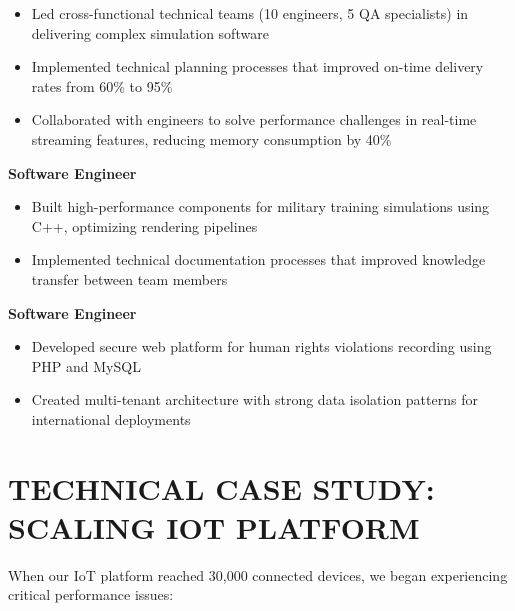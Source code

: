 \documentclass{fullstackdeveloper-ats}
\begin{document}
\begin{itemize}
    \item Led cross-functional technical teams (10 engineers, 5 QA specialists) in delivering complex simulation software
    \item Implemented technical planning processes that improved on-time delivery rates from 60\% to 95\%
    \item Collaborated with engineers to solve performance challenges in real-time streaming features, reducing memory consumption by 40\%
\end{itemize}

\vspace{0.2cm}

\noindent\textbf{Software Engineer} \hfill {}\\

\begin{itemize}
    \item Built high-performance components for military training simulations using C++, optimizing rendering pipelines
    \item Implemented technical documentation processes that improved knowledge transfer between team members
\end{itemize}

\vspace{0.2cm}

\noindent\textbf{Software Engineer} \hfill {}\\

\begin{itemize}
    \item Developed secure web platform for human rights violations recording using PHP and MySQL
    \item Created multi-tenant architecture with strong data isolation patterns for international deployments
\end{itemize}

\section{TECHNICAL CASE STUDY: SCALING IOT PLATFORM}

\noindent When our IoT platform reached 30,000 connected devices, we began experiencing critical performance issues:
\end{document}
